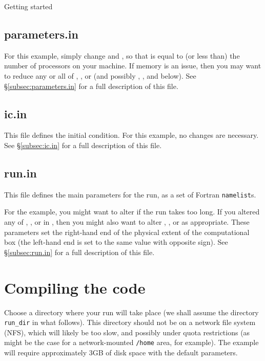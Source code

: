 \begin{chapter}{\label{cha:quickstart}Getting started}
  \subsection{parameters.in}
  For this example, simply change  and , so
  that  is equal to (or less than) the number of
  processors on your machine.  If memory is an issue, then you may want to
  reduce any or all of , , or  (and possibly
  , , and  below).  See
  \S\ref{subsec:parameters.in} for a full description of this file.  

  \subsection{ic.in}
  This file defines the initial condition.  For this example, no changes are
  necessary.  See \S\ref{subsec:ic.in} for a full description of this file.

  \subsection{\label{subsec:runin}run.in}
  This file defines the main parameters for the run, as a set of Fortran
  \verb"namelist"s.
  
  For the  example, you might want to alter
   if the run takes too long.  If you altered any of
  , , or  in , then you
  might also want to alter , , or  as
  appropriate.  These parameters set the right-hand end of the physical extent
  of the computational box (the left-hand end is set to the same value with
  opposite sign).  See \S\ref{subsec:run.in} for a full description of this
  file.

  \section{Compiling the code}
  Choose a directory where your run will take place (we shall assume the
  directory \verb"run_dir" in what follows).  This directory should not be on a
  network file system (NFS), which will likely be too slow, and possibly under
  quota restrictions (as might be the case for a network-mounted \verb"/home"
  area, for example).  The  example will require approximately
  3GB of disk space with the default parameters.


\end{chapter}
